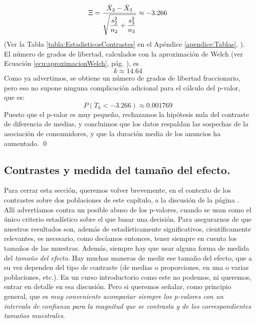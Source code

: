 \begin{ejemplo}
\[\Xi=\dfrac{\bar X_2-\bar X_3}{\scriptsize{\sqrt{\dfrac{s_2^2}{n_2}+\dfrac{s_3^2}{n_3}}}}
\approx -3.266\]
(Ver la Tabla \ref{tabla:EstadisticosContrastes} en el Apéndice \ref{apendice:Tablas}, \pageref{tabla:EstadisticosContrastes}). El número de grados de libertad, calculados con la aproximación de Welch (ver Ecuación \ref{ecu:aproximacionWelch}, pág. \pageref{ecu:aproximacionWelch}), es
\[k\approx 14.64\]
Como ya advertimos, se obtiene un número de grados de libertad fraccionario, pero eso no supone ninguna complicación adicional para el cálculo del p-valor, que es:
\[P(T_{k} < -3.266)\approx 0.001769\]
Puesto que el p-valor es muy pequeño, rechazamos la hipótesis nula del contraste de diferencia de medias, y concluimos que los datos respaldan las sospechas de la asociación de consumidores, y que la duración media de los anuncios ha aumentado.
\qed
\end{ejemplo}


\subsection{Contrastes y medida del tamaño del efecto.}
\label{cap09:subsec:MedidaTamannoEfecto}

Para cerrar esta sección, queremos volver brevemente, en el contexto de los contrastes sobre dos poblaciones de este capítulo, a la discusión de la página \pageref{cap07:subsubsec:AdvertenciaAbusoPValor}. Allí advertíamos contra un posible abuso de los p-valores, cuando se usan como el único criterio estadístico sobre el que basar una decisión. Para asegurarnos de que nuestros resultados son, además de estadísticamente significativos, científicamente relevantes, es necesario, como decíamos entonces, tener siempre en cuenta los tamaños de las muestras. Además, siempre hay que usar alguna forma de medida del {\em tamaño del efecto}. Hay muchas maneras de medir ese tamaño del efecto, que a su vez dependen del tipo de contraste (de medias o proporciones, en una o varias poblaciones, etc.). En un curso introductorio como este no podemos, ni queremos, entrar en detalle en esa discusión. Pero si queremos señalar, como principio general, que es {\em muy conveniente acompañar siempre los p-valores con un intervalo de confianza para la magnitud que se contrasta y de los correspondientes tamaños muestrales}.

